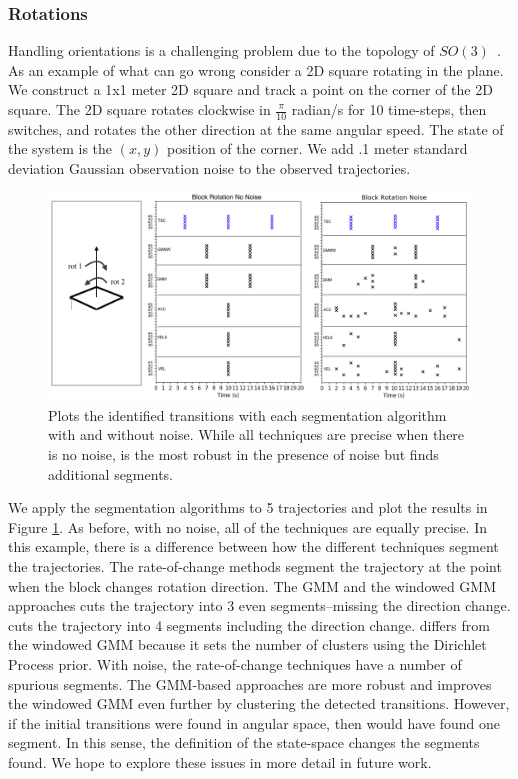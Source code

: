 \subsubsection{Rotations}
Handling orientations is a challenging problem due to the topology of $SO(3)$~\cite{ude2014orientation}. 
As an example of what can go wrong consider a 2D square rotating in the plane.
We construct a 1x1 meter 2D square and track a point on the corner of the 2D square.
The 2D square rotates clockwise in $\frac{\pi}{10}$ radian/s for 
10 time-steps, then switches, and rotates the other direction at the same angular speed.
The state of the system is the $(x,y)$ position of the corner.
We add .1 meter standard deviation Gaussian observation noise to the observed trajectories.

\begin{figure}%
\centering
\includegraphics[width=\columnwidth]{tsc-experiments/block-results2.png}
\caption{Plots the identified transitions with each segmentation algorithm with and without noise. While all techniques are precise when there is no noise, \tsc is the most robust in the presence of noise but finds additional segments. \label{block-results}}
\end{figure}


We apply the segmentation algorithms to 5 trajectories and plot the results in Figure \ref{block-results}.
As before, with no noise, all of the techniques are equally precise.
In this example, there is a difference between how the different techniques segment the trajectories.
The rate-of-change methods segment the trajectory at the point when the block changes rotation direction.
The GMM and the windowed GMM approaches cuts the trajectory into 3 even segments--missing the direction change.
\tsc cuts the trajectory into 4 segments including the direction change.
\tsc differs from the windowed GMM because it sets the number of clusters using the Dirichlet Process prior.
With noise, the rate-of-change techniques have a number of spurious segments.
The GMM-based approaches are more robust and \tsc improves the windowed GMM even further by clustering the detected transitions.
However, if the initial transitions were found in angular space, then \tsc would have found one segment.
In this sense, the definition of the state-space changes the segments found.
We hope to explore these issues in more detail in future work.


